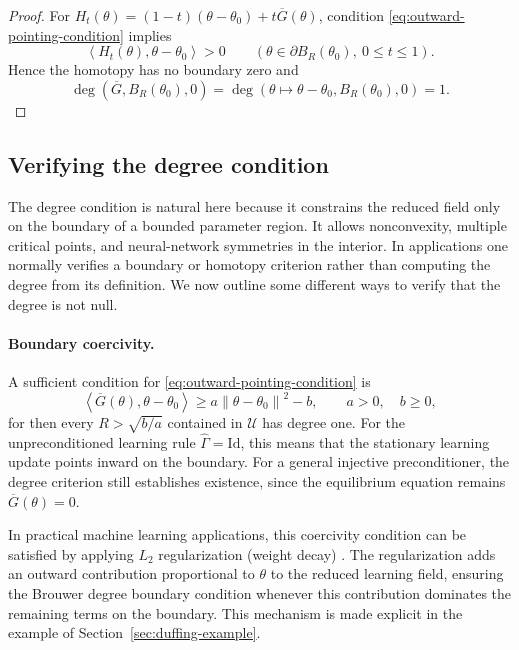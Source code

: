 \documentclass[11pt]{article}
\theoremstyle{definition}
\theoremstyle{remark}
\newcommand{\norm}[1]{\left\lVert #1\right\rVert}
\begin{document}
\begin{proof}
For
\(H_t(\theta)=(1-t)(\theta-\theta_0)+t\overline G(\theta)\),
condition \eqref{eq:outward-pointing-condition} implies
\[
  \left\langle H_t(\theta),\theta-\theta_0\right\rangle>0
  \qquad
  (\theta\in\partial B_R(\theta_0),\ 0\leq t\leq1).
\]
Hence the homotopy has no boundary zero and
\[
  \deg(\overline G,B_R(\theta_0),0)
  =\deg(\theta\mapsto\theta-\theta_0,B_R(\theta_0),0)=1.
\]
\end{proof}

\subsection{Verifying the degree condition}\label{4.1}

The degree condition is natural here because it constrains the reduced field
only on the boundary of a bounded parameter region.  It allows nonconvexity,
multiple critical points, and neural-network symmetries in the interior.
In applications one normally verifies a boundary or homotopy criterion rather
than computing the degree from its definition. We now outline some different ways to verify that the degree is not null.

\paragraph{Boundary coercivity.}
A sufficient condition for
\eqref{eq:outward-pointing-condition} is
\begin{equation}
  \left\langle\overline G(\theta),\theta-\theta_0\right\rangle
  \geq a\norm{\theta-\theta_0}^2-b,
  \qquad a>0,\quad b\geq0,
  \label{eq:degree-coercive-bound}
\end{equation}
for then every \(R>\sqrt{b/a}\) contained in \(\mathcal U\) has degree one.
For the unpreconditioned learning rule
$\widehat\Gamma=\mathrm{Id}$, this means that the stationary
learning update points inward on the boundary.
For a general injective preconditioner, the degree criterion
still establishes existence, since the equilibrium equation
remains $\overline G(\theta)=0$.



In practical machine learning applications, this coercivity condition can be  satisfied by applying \(L_2\) regularization (weight decay) \cite{goodfellow2016deep}. 
The regularization adds an outward contribution proportional to $\theta$
to the reduced learning field, ensuring the Brouwer degree
boundary condition whenever this contribution dominates
the remaining terms on the boundary.
This mechanism is made explicit in the example of
Section~\ref{sec:duffing-example}.
\end{document}
